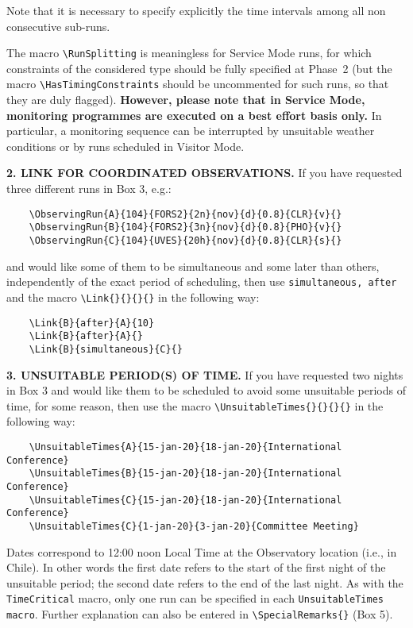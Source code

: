 \documentclass{article}
\begin{document}
Note that it is necessary to specify explicitly the time intervals
among all non consecutive sub-runs.

The macro \verb|\RunSplitting| is meaningless for Service Mode runs,
for which constraints of the considered type should be fully specified
at Phase~2 (but the macro \verb|\HasTimingConstraints| should be
uncommented for such runs, so that they are duly flagged). {\bf
However, please note that in Service Mode, 
monitoring programmes are executed on a best effort 
basis only.} In particular, a monitoring sequence can be interrupted
by unsuitable weather conditions or by runs scheduled in Visitor Mode.

\medskip

{\bf 2.  LINK FOR COORDINATED OBSERVATIONS.} If you have requested
three different runs in Box 3, e.g.:
\begin{verbatim}
    \ObservingRun{A}{104}{FORS2}{2n}{nov}{d}{0.8}{CLR}{v}{}
    \ObservingRun{B}{104}{FORS2}{3n}{nov}{d}{0.8}{PHO}{v}{}
    \ObservingRun{C}{104}{UVES}{20h}{nov}{d}{0.8}{CLR}{s}{}
\end{verbatim}
and would like some of them to be simultaneous and some later than
others, independently of the exact period of scheduling, then use
\verb|simultaneous, after| and the macro \verb|\Link{}{}{}{}| in the
following way:
\begin{verbatim}
    \Link{B}{after}{A}{10}
    \Link{B}{after}{A}{}
    \Link{B}{simultaneous}{C}{}
\end{verbatim}

\medskip

{\bf 3. UNSUITABLE PERIOD(S) OF TIME.}  If you have requested two
nights in Box 3 and would like them to be scheduled to avoid some
unsuitable periods of time, for some reason, then use the macro
\verb|\UnsuitableTimes{}{}{}{}| in the following way:
\begin{verbatim}
    \UnsuitableTimes{A}{15-jan-20}{18-jan-20}{International Conference}
    \UnsuitableTimes{B}{15-jan-20}{18-jan-20}{International Conference}
    \UnsuitableTimes{C}{15-jan-20}{18-jan-20}{International Conference}
    \UnsuitableTimes{C}{1-jan-20}{3-jan-20}{Committee Meeting}
\end{verbatim}

Dates correspond to 12:00 noon Local Time at
the Observatory location (i.e., in Chile).
In other words the first date refers to the start of the first night
of the unsuitable period; the second date refers to the end of the last night.
As with the \verb|TimeCritical| macro, only one run can be specified in each
\verb|UnsuitableTimes macro|. 
Further explanation can also be entered in  \verb|\SpecialRemarks{}| (Box 5).
\end{document}
